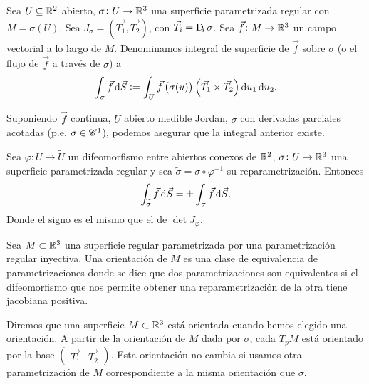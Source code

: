 \begin{defi}
    Sea $U \subseteq \mathbb{R}^2$ abierto, $\sigma \colon U \to \mathbb{R}^3$ una superficie parametrizada regular con
    $M = \sigma(U)$. Sea $J_\sigma = \left( \vec{T_1}, \vec{T_2} \right)$, con $\vec{T_i} = \Dif_i \sigma$.
    Sea $\vec{f} \colon M \to \mathbb{R}^3$ un campo vectorial a lo largo de $M$. Denominamos integral de superficie de $\vec{f}$
    sobre $\sigma$ (o el flujo de $\vec{f}$ a través de $\sigma$) a
    \[
        \int_\sigma \vec{f} \dif \vec{S} := \int_U \vec{f}\left( \sigma(u) \right) \left( \vec{T_1} \times \vec{T_2} \right) \dif u_1 \dif u_2.
    \]
\end{defi}

\begin{obs}
    Suponiendo $\vec{f}$ continua, $U$ abierto medible Jordan, $\sigma$ con derivadas parciales acotadas (p.e. $\sigma \in \mathscr{C}^1$),
    podemos asegurar que la integral anterior existe.
\end{obs}

\begin{lema}
    Sea $\varphi \colon U \to \widetilde{U}$ un difeomorfismo entre abiertos conexos de $\mathbb{R}^2$, $\sigma \colon U \to \mathbb{R}^3$ una superficie
    parametrizada regular y sea $\widetilde{\sigma} = \sigma \circ \varphi^{-1}$ su reparametrización. Entonces
    \[
        \int_{\widetilde{\sigma}} \vec{f} \dif \vec{S} = \pm \int_\sigma \vec{f} \dif \vec{S}.
    \]
    Donde el signo es el mismo que el de $\det J_\varphi$.
\end{lema}

\begin{defi}
    Sea $M \subset \mathbb{R}^3$ una superficie regular parametrizada por una parametrización regular inyectiva. Una orientación de $M$ es una
    clase de equivalencia de parametrizaciones donde se dice que dos parametrizaciones son equivalentes si el difeomorfismo que nos permite
    obtener una reparametrización de la otra tiene jacobiana positiva.
\end{defi}

\begin{defi}
    Diremos que una superficie $M \subset \mathbb{R}^3$ está orientada cuando hemos elegido una orientación. A partir de la orientación de $M$ dada
    por $\sigma$, cada $T_pM$ está orientado por la base $\begin{pmatrix} \vec{T_1} & \vec{T_2} \end{pmatrix}$. Esta orientación no cambia si
    usamos otra parametrización de $M$ correspondiente a la misma orientación que $\sigma$.
\end{defi}

